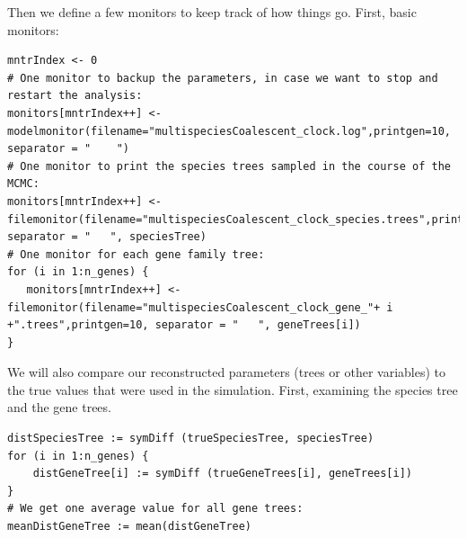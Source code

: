 \documentclass[11pt]{article}
\begin{document}
{\begin{framed}
Then we define a few monitors to keep track of how things go. 
First, basic monitors:
{\tt \begin{snugshade*}
\begin{lstlisting}
mntrIndex <- 0
# One monitor to backup the parameters, in case we want to stop and restart the analysis:
monitors[mntrIndex++] <- modelmonitor(filename="multispeciesCoalescent_clock.log",printgen=10, separator = "	")
# One monitor to print the species trees sampled in the course of the MCMC:
monitors[mntrIndex++] <- filemonitor(filename="multispeciesCoalescent_clock_species.trees",printgen=10, separator = "	", speciesTree)
# One monitor for each gene family tree:
for (i in 1:n_genes) {
   monitors[mntrIndex++] <- filemonitor(filename="multispeciesCoalescent_clock_gene_"+ i +".trees",printgen=10, separator = "	", geneTrees[i])
}
\end{lstlisting}
\end{snugshade*}}
We will also compare our reconstructed parameters (trees or other variables) to the true values that were used in the simulation.
First, examining the species tree and the gene trees.
{\tt \begin{snugshade*}
\begin{lstlisting}
distSpeciesTree := symDiff (trueSpeciesTree, speciesTree)
for (i in 1:n_genes) {
	distGeneTree[i] := symDiff (trueGeneTrees[i], geneTrees[i])
}
# We get one average value for all gene trees:
meanDistGeneTree := mean(distGeneTree)
\end{lstlisting}
\end{snugshade*}}


\end{framed}}
\end{document}
